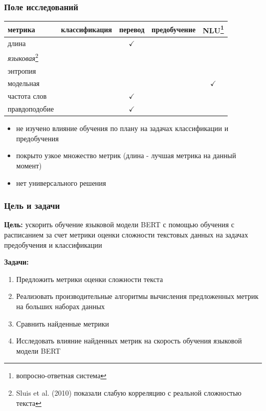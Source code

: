 \documentclass{beamer}
\begin{document}
\begin{frame}
	\frametitle{Поле исследований}
	\begin{table}
		\begin{tabular}{l|cccc}
			метрика & классификация & перевод & предобучение & NLU\footnote[1]{вопросно-ответная система} \\
			\hline
			длина & & $\checkmark$ & & \\
			{\it языковая}\footnote[2]{Sluis et al. (2010) показали слабую корреляцию с реальной сложностью текста} & & & & \\
			энтропия & & & & \\
			модельная & & & & $\checkmark$ \\
			частота слов & & $\checkmark$ & & \\
			правдоподобие & & $\checkmark$ & & \\
			\hline
		\end{tabular}
	\end{table}
	\begin{itemize}
		\item не изучено влияние обучения по плану на задачах классификации и предобучения
		\item покрыто узкое множество метрик (длина - лучшая метрика на данный момент)
		\item нет универсального решения
	\end{itemize}
\end{frame}

\begin{frame}
	\frametitle{Цель и задачи}
	{\bf Цель:} ускорить обучение языковой модели BERT с помощью обучения с расписанием за счет метрики оценки сложности текстовых данных на задачах предобучения и классификации
	
	{\bf Задачи:}
	\begin{enumerate}
		\item Предложить метрики оценки сложности текста
		\item Реализовать производительные алгоритмы вычисления предложенных метрик на больших наборах данных
		\item Сравнить найденные метрики
		\item Исследовать влияние найденных метрик на скорость обучения языковой модели BERT
	\end{enumerate}
\end{frame}
\end{document}
